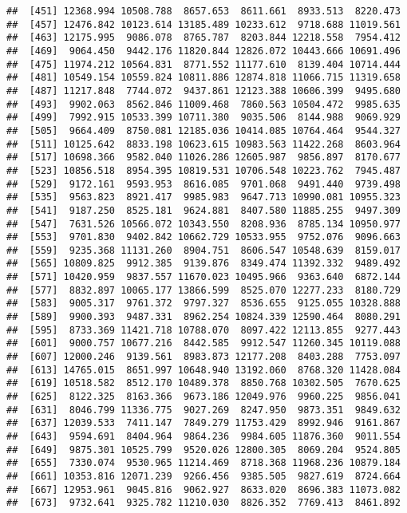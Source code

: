 \documentclass[]{article}
\begin{document}
\begin{verbatim}
##  [451] 12368.994 10508.788  8657.653  8611.661  8933.513  8220.473
##  [457] 12476.842 10123.614 13185.489 10233.612  9718.688 11019.561
##  [463] 12175.995  9086.078  8765.787  8203.844 12218.558  7954.412
##  [469]  9064.450  9442.176 11820.844 12826.072 10443.666 10691.496
##  [475] 11974.212 10564.831  8771.552 11177.610  8139.404 10714.444
##  [481] 10549.154 10559.824 10811.886 12874.818 11066.715 11319.658
##  [487] 11217.848  7744.072  9437.861 12123.388 10606.399  9495.680
##  [493]  9902.063  8562.846 11009.468  7860.563 10504.472  9985.635
##  [499]  7992.915 10533.399 10711.380  9035.506  8144.988  9069.929
##  [505]  9664.409  8750.081 12185.036 10414.085 10764.464  9544.327
##  [511] 10125.642  8833.198 10623.615 10983.563 11422.268  8603.964
##  [517] 10698.366  9582.040 11026.286 12605.987  9856.897  8170.677
##  [523] 10856.518  8954.395 10819.531 10706.548 10223.762  7945.487
##  [529]  9172.161  9593.953  8616.085  9701.068  9491.440  9739.498
##  [535]  9563.823  8921.417  9985.983  9647.713 10990.081 10955.323
##  [541]  9187.250  8525.181  9624.881  8407.580 11885.255  9497.309
##  [547]  7631.526 10566.072 10343.550  8208.936  8785.134 10950.977
##  [553]  9701.830  9402.842 10662.729 10533.955  9752.076  9096.663
##  [559]  9235.368 11131.260  8904.751  8606.547 10548.639  8159.017
##  [565] 10809.825  9912.385  9139.876  8349.474 11392.332  9489.492
##  [571] 10420.959  9837.557 11670.023 10495.966  9363.640  6872.144
##  [577]  8832.897 10065.177 13866.599  8525.070 12277.233  8180.729
##  [583]  9005.317  9761.372  9797.327  8536.655  9125.055 10328.888
##  [589]  9900.393  9487.331  8962.254 10824.339 12590.464  8080.291
##  [595]  8733.369 11421.718 10788.070  8097.422 12113.855  9277.443
##  [601]  9000.757 10677.216  8442.585  9912.547 11260.345 10119.088
##  [607] 12000.246  9139.561  8983.873 12177.208  8403.288  7753.097
##  [613] 14765.015  8651.997 10648.940 13192.060  8768.320 11428.084
##  [619] 10518.582  8512.170 10489.378  8850.768 10302.505  7670.625
##  [625]  8122.325  8163.366  9673.186 12049.976  9960.225  9856.041
##  [631]  8046.799 11336.775  9027.269  8247.950  9873.351  9849.632
##  [637] 12039.533  7411.147  7849.279 11753.429  8992.946  9161.867
##  [643]  9594.691  8404.964  9864.236  9984.605 11876.360  9011.554
##  [649]  9875.301 10525.799  9520.026 12800.305  8069.204  9524.805
##  [655]  7330.074  9530.965 11214.469  8718.368 11968.236 10879.184
##  [661] 10353.816 12071.239  9266.456  9385.505  9827.619  8724.664
##  [667] 12953.961  9045.816  9062.927  8633.020  8696.383 11073.082
##  [673]  9732.641  9325.782 11210.030  8826.352  7769.413  8461.892

\end{verbatim}
\end{document}
